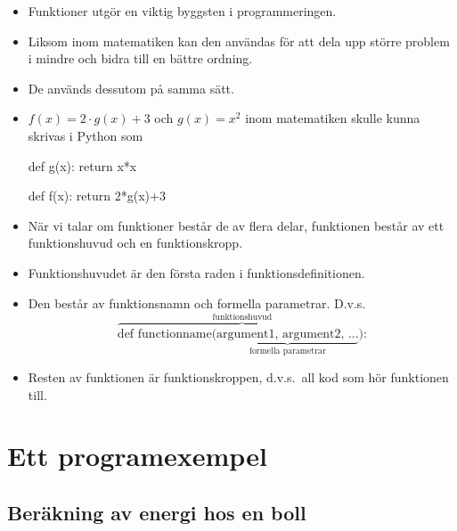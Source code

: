 \documentclass{beamer}
\begin{document}
\begin{frame}[fragile]{\insertsubsectionhead}
  \begin{itemize}
    \item Funktioner utgör en viktig byggsten i programmeringen.
    \item Liksom inom matematiken kan den användas för att dela upp större 
      problem i mindre och bidra till en bättre ordning.
    \item De används dessutom på samma sätt.
    \item \(f(x) = 2 \cdot g(x) + 3\) och \(g(x) = x^2\) inom matematiken 
      skulle kunna skrivas i Python som
      \begin{code}
def g(x):
    return x*x

def f(x):
    return 2*g(x)+3
      \end{code}
  \end{itemize}
\end{frame}

\begin{frame}{\insertsubsectionhead}
  \begin{itemize}
    \item När vi talar om funktioner består de av flera delar, funktionen 
      består av ett funktionshuvud och en funktionskropp.
    \item Funktionshuvudet är den första raden i funktionsdefinitionen.
    \item Den består av funktionsnamn och formella parametrar.
      D.v.s.
  \[
  \overbrace{\text{def functionname(}
    \underbrace{\text{argument1, argument2, ...}}_{\text{formella
      parametrar}}\text{):}}^{\text{funktionshuvud}}
  \]
    \item Resten av funktionen är funktionskroppen, d.v.s.\ all kod som hör 
      funktionen till.
  \end{itemize}
\end{frame}


\section{Ett programexempel}

\subsection{Beräkning av energi hos en boll}

\begin{frame}{\insertsubsectionhead}
  
\end{frame}
\end{document}
